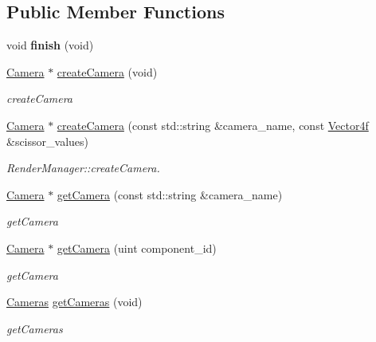 \subsection*{Public Member Functions}
\begin{DoxyCompactItemize}
\item 
\hypertarget{classEngine_1_1CameraManager_ada4e1659dc34f63e8feb300a5425ab33}{}void {\bfseries finish} (void)\label{classEngine_1_1CameraManager_ada4e1659dc34f63e8feb300a5425ab33}

\item 
\hyperlink{classEngine_1_1Camera}{Camera} $\ast$ \hyperlink{classEngine_1_1CameraManager_a1ba4fff2c27f8e71b42db9df1411c87b}{create\+Camera} (void)
\begin{DoxyCompactList}\small\item\em create\+Camera \end{DoxyCompactList}\item 
\hyperlink{classEngine_1_1Camera}{Camera} $\ast$ \hyperlink{classEngine_1_1CameraManager_ab5ca3c3c1d5e47197c77359c406caf80}{create\+Camera} (const std\+::string \&camera\+\_\+name, const \hyperlink{classVector4}{Vector4f} \&scissor\+\_\+values)
\begin{DoxyCompactList}\small\item\em Render\+Manager\+::create\+Camera. \end{DoxyCompactList}\item 
\hyperlink{classEngine_1_1Camera}{Camera} $\ast$ \hyperlink{classEngine_1_1CameraManager_a1944ff084f6aa681f1d04baf26880fde}{get\+Camera} (const std\+::string \&camera\+\_\+name)
\begin{DoxyCompactList}\small\item\em get\+Camera \end{DoxyCompactList}\item 
\hyperlink{classEngine_1_1Camera}{Camera} $\ast$ \hyperlink{classEngine_1_1CameraManager_acc64e137d415f4a79b704a4abc506c1e}{get\+Camera} (uint component\+\_\+id)
\begin{DoxyCompactList}\small\item\em get\+Camera \end{DoxyCompactList}\item 
\hyperlink{classEngine_1_1CameraManager_aadc529c6b245d7b6f57774bba20f1c21}{Cameras} \hyperlink{classEngine_1_1CameraManager_ad0d91631c2ac9451a7d92e353f266740}{get\+Cameras} (void)
\begin{DoxyCompactList}\small\item\em get\+Cameras \end{DoxyCompactList}\item 

\end{DoxyCompactItemize}
